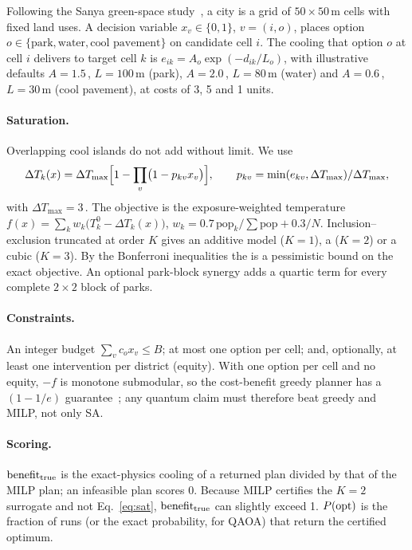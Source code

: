 Following the Sanya green-space study~\cite{zhou2023}, a city is a grid of $50\times50$\,m cells
with fixed land uses. A decision variable $x_v\in\{0,1\}$, $v=(i,o)$, places option
$o\in\{\text{park},\text{water},\text{cool pavement}\}$ on candidate cell $i$. The cooling that
option $o$ at cell $i$ delivers to target cell $k$ is $e_{ik}=A_o\exp(-d_{ik}/L_o)$, with
illustrative defaults $A=1.5$\,\degC{}, $L=100$\,m (park), $A=2.0$\,\degC{}, $L=80$\,m (water) and
$A=0.6$\,\degC{}, $L=30$\,m (cool pavement), at costs of 3, 5 and 1 units.

\paragraph{Saturation.} Overlapping cool islands do not add without limit. We use
\begin{equation}
\Delta T_k(x)=\Delta T_{\max}\Bigl[1-\prod_v\bigl(1-p_{kv}x_v\bigr)\Bigr],\qquad
p_{kv}=\min(e_{kv},\Delta T_{\max})/\Delta T_{\max},
\label{eq:sat}
\end{equation}
with $\Delta T_{\max}=3$\,\degC{}. The objective is the exposure-weighted temperature
$f(x)=\sum_k w_k\bigl(T^0_k-\Delta T_k(x)\bigr)$, $w_k=0.7\,\mathrm{pop}_k/\sum\mathrm{pop}+0.3/N$.
Inclusion--exclusion truncated at order $K$ gives an additive model ($K{=}1$), a \QUBO{} ($K{=}2$)
or a cubic \HUBO{} ($K{=}3$). By the Bonferroni inequalities the \QUBO{} is a pessimistic bound on
the exact objective. An optional park-block synergy adds a quartic term for every complete
$2\times2$ block of parks.

\paragraph{Constraints.} An integer budget $\sum_v c_o x_v\le B$; at most one option per cell;
and, optionally, at least one intervention per district (equity). With one option per cell and no
equity, $-f$ is monotone submodular, so the cost-benefit greedy planner has a
$(1-1/e)$ guarantee~\cite{nemhauser1978}; any quantum claim must therefore beat greedy and MILP,
not only SA.

\paragraph{Scoring.} $\mathrm{benefit}_{\mathrm{true}}$ is the exact-physics cooling of a returned plan divided by that of
the MILP plan; an infeasible plan scores 0. Because MILP certifies the $K{=}2$ surrogate and not
Eq.~\eqref{eq:sat}, $\mathrm{benefit}_{\mathrm{true}}$ can slightly exceed 1. $P(\mathrm{opt})$ is the fraction of runs (or the exact
probability, for QAOA) that return the certified optimum.
